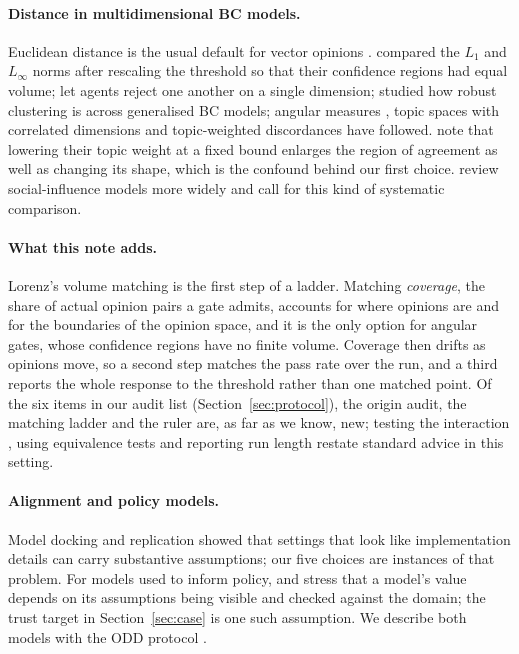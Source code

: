 \documentclass[11pt]{article}
\begin{document}
\paragraph{Distance in multidimensional BC models.}
Euclidean distance is the usual default for vector opinions \citep{fortunato2005,lorenz2007}.
\citet{lorenz2008} compared the $L_1$ and $L_\infty$ norms after rescaling the threshold so that their confidence regions had equal volume; \citet{huet2008} let agents reject one another on a single dimension; \citet{kurahashi2016} studied how robust clustering is across generalised BC models; angular measures \citep{schweighofer2020}, topic spaces with correlated dimensions \citep{baumann2021} and topic-weighted discordances \citep{li2026} have followed.
\citet{li2026} note that lowering their topic weight at a fixed bound enlarges the region of agreement as well as changing its shape, which is the confound behind our first choice.
\citet{flache2017} review social-influence models more widely and call for this kind of systematic comparison.

\paragraph{What this note adds.}
Lorenz's volume matching is the first step of a ladder.
Matching \emph{coverage}, the share of actual opinion pairs a gate admits, accounts for where opinions are and for the boundaries of the opinion space, and it is the only option for angular gates, whose confidence regions have no finite volume.
Coverage then drifts as opinions move, so a second step matches the pass rate over the run, and a third reports the whole response to the threshold rather than one matched point.
Of the six items in our audit list (Section~\ref{sec:protocol}), the origin audit, the matching ladder and the ruler are, as far as we know, new; testing the interaction \citep{gelman2006}, using equivalence tests \citep{lakens2017} and reporting run length restate standard advice in this setting.

\paragraph{Alignment and policy models.}
Model docking and replication \citep{axtell1996,wilensky2007} showed that settings that look like implementation details can carry substantive assumptions; our five choices are instances of that problem.
For models used to inform policy, \citet{gilbert2018} and \citet{windrum2007} stress that a model's value depends on its assumptions being visible and checked against the domain; the trust target in Section~\ref{sec:case} is one such assumption.
We describe both models with the ODD protocol \citep{grimm2020}.
\end{document}
